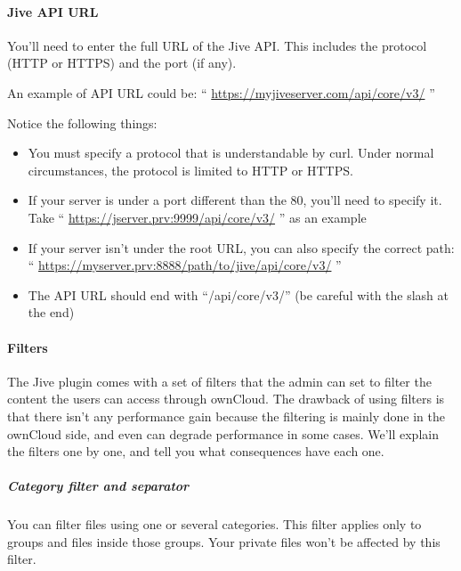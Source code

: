 \documentclass[letterpaper,10pt,english]{sphinxmanual}
\begin{document}
\paragraph{Jive API URL}
\label{enterprise_external_storage/jive_configuration:jive-api-url}
You'll need to enter the full URL of the Jive API. This includes the protocol (HTTP or HTTPS) and the port (if any).

An example of API URL could be: “
\href{https://myjiveserver.com/api/core/v3/}{https://myjiveserver.com/api/core/v3/}
”

Notice the following things:
\begin{itemize}
\item {} 
You must specify a protocol that is understandable by curl. Under normal circumstances, the protocol is limited to HTTP or HTTPS.

\item {} 
If your server is under a port different than the 80, you'll need to specify it. Take “
\href{https://jserver.prv:9999/api/core/v3/}{https://jserver.prv:9999/api/core/v3/}
” as an example

\item {} 
If your server isn't under the root URL, you can also specify the correct path: “
\href{https://myserver.prv:8888/path/to/jive/api/core/v3/}{https://myserver.prv:8888/path/to/jive/api/core/v3/}
”

\item {} 
The API URL should end with “/api/core/v3/” (be careful with the slash at the end)

\end{itemize}


\paragraph{Filters}
\label{enterprise_external_storage/jive_configuration:filters}
The Jive plugin comes with a set of filters that the admin can set to filter the content the users can access
through ownCloud. The drawback of using filters is that there isn't any performance gain because the filtering
is mainly done in the ownCloud side, and even can degrade performance in some cases. We'll explain the filters
one by one, and tell you what consequences have each one.


\subparagraph{Category filter and separator}
\label{enterprise_external_storage/jive_configuration:category-filter-and-separator}
You can filter files using one or several categories. This filter applies only to groups and files
inside those groups.
Your private files won't be affected by this filter.
\end{document}
